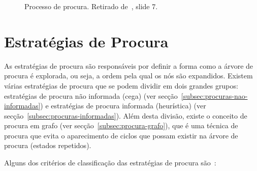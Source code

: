 \begin{figure}[H]
    \begin{center}
    \end{center}
    \caption{Processo de procura.
    Retirado de~\cite{isel:iasa:slides:proc-espaco-estados-parte-1}, slide 7.}
    \label{fig:processo-procura}
\end{figure}


\section{Estratégias de Procura}\label{sec:estrategias-procura}
As estratégias de procura são responsáveis por definir a forma como a árvore de procura é explorada, ou seja, a ordem pela qual os nós são expandidos.
Existem várias estratégias de procura que se podem dividir em dois grandes grupos: estratégias de procura não informada (cega) (ver secção~\ref{subsec:procuras-nao-informadas}) e estratégias de procura informada (heurística) (ver secção~\ref{subsec:procuras-informadas}).
Além desta divisão, existe o conceito de procura em grafo (ver secção~\ref{subsec:procura-grafo}), que é uma técnica de procura que evita o aparecimento de ciclos que possam existir na árvore de procura (estados repetidos).

Alguns dos critérios de classificação das estratégias de procura são~\cite{ist:leic:resumos:procura-cega, isel:iasa:slides:proc-espaco-estados-parte-2}:

